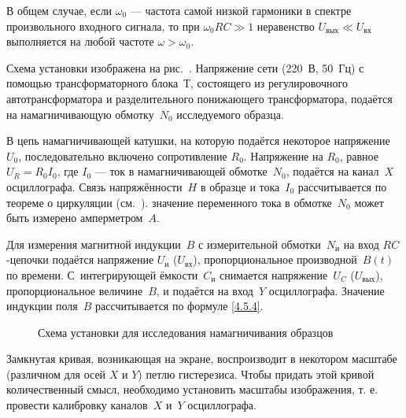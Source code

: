 В общем случае, если $\omega_0$ --- частота самой низкой гармоники в спектре произвольного
входного сигнала, то при $\omega_0 R C\gg1$ неравенство $U_{вых}\ll U_{вх}$ выполняется
на любой частоте $\omega>\omega_0$.







\experiment
 Схема установки изображена на рис.~.
Напряжение сети (220~В, 50~Гц) с помощью трансформаторного блока~Т,
состоящего из регулировочного автотрансформатора
и разделительного понижающего трансформатора, подаётся на намагничивающую
обмотку~$N_0$ исследуемого образца.

В цепь намагничивающей катушки, на которую подаётся некоторое напряжение
$U_0$, последовательно включено сопротивление $R_0$.
Напряжение на $R_0$, равное $U_R=R_0I_0$, где $I_0$ --- ток в
намагничивающей обмотке~$N_0$, подаётся на канал~$X$ осциллографа.
Связь напряжённости~$H$ в образце и тока~$I_0$ рассчитывается по теореме
о циркуляции (см.~).
 значение переменного тока в обмотке~$N_0$ может быть измерено
амперметром~$A$.

Для измерения магнитной индукции~$B$ с измерительной обмотки~$N_{и}$ на
вход $RC$-цепочки подаётся напряжение $U_{и}$ ($U_{вх}$),
пропорциональное производной~$B(t)$ по времени.
С~интегрирующей ёмкости~$C_{и}$ снимается напряжение~$U_C$ ($U_{вых}$),
пропорциональное величине~$B$, и подаётся на вход~$Y$ осциллографа.
Значение индукции поля~$B$ рассчитывается по формуле
\eqref{4.5.4}.

\begin{figure}[h!]
\centering
	\caption{Схема установки для исследования намагничивания образцов}
\end{figure}

Замкнутая кривая, возникающая на экране, воспроизводит в некотором масштабе
(различном для осей $X$ и $Y$) петлю гистерезиса. Чтобы придать этой кривой
количественный смысл, необходимо установить масштабы изображения, т. е. провести
калибровку каналов~$X$ и~$Y$ осциллографа.
%



